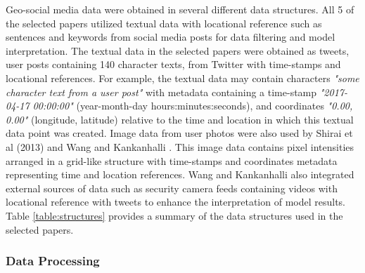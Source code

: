 Geo-social media data were obtained in several different data structures. All 5 of the selected papers utilized textual data with locational reference such as sentences and keywords from social media posts for data filtering and model interpretation. The textual data in the selected papers were obtained as tweets, user posts containing 140 character texts, from Twitter \cite{Twitter:2017} with time-stamps and locational references. For example, the textual data may contain characters \textit{"some character text from a user post"} with metadata containing a time-stamp \textit{"2017-04-17 00:00:00"} (year-month-day hours:minutes:seconds), and coordinates \textit{"0.00, 0.00"} (longitude, latitude) relative to the time and location in which this textual data point was created. Image data from user photos were also used by Shirai et al (2013) \cite{Shirai:2013} and Wang and Kankanhalli \cite{Wang:2015}. This image data contains pixel intensities arranged in a grid-like structure with time-stamps and coordinates metadata representing time and location references. Wang and Kankanhalli \cite{Wang:2015} also integrated external sources of data such as security camera feeds containing videos with locational reference with tweets to enhance the interpretation of model results. Table \ref{table:structures} provides a summary of the data structures used in the selected papers.

\subsubsection{Data Processing} \label{data-processing}

